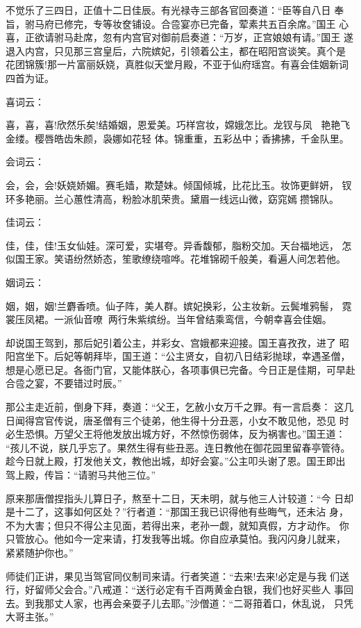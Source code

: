 不觉乐了三四日，正值十二日佳辰。有光禄寺三部各官回奏道：“臣等自八日
奉旨，驸马府已修完，专等妆奁铺设。合卺宴亦已完备，荤素共五百余席。”国王
心喜，正欲请驸马赴席，忽有内宫官对御前启奏道：“万岁，正宫娘娘有请。”国王
遂退入内宫，只见那三宫皇后，六院嫔妃，引领着公主，都在昭阳宫谈笑。真个是
花团锦簇!那一片富丽妖娆，真胜似天堂月殿，不亚于仙府瑶宫。有喜会佳姻新词
四首为证。

喜词云：

喜，喜，喜!欣然乐矣!结婚姻，恩爱美。巧样宫妆，嫦娥怎比。龙钗与凤，
艳艳飞金缕。樱唇皓齿朱颜，袅娜如花轻
体。锦重重，五彩丛中；香拂拂，千金队里。

会词云：

会，会，会!妖娆娇媚。赛毛嫱，欺楚妹。倾国倾城，比花比玉。妆饰更鲜妍，
钗环多艳丽。兰心蕙性清高，粉脸冰肌荣贵。黛眉一线远山微，窈窕嫣攒锦队。

佳词云：

佳，佳，佳!玉女仙娃。深可爱，实堪夸。异香馥郁，脂粉交加。天台福地远，
怎似国王家。笑语纷然娇态，笙歌缭绕喧哗。花堆锦砌千般美，看遍人间怎若他。

姻词云：

姻，姻，姻!兰麝香喷。仙子阵，美人群。嫔妃换彩，公主妆新。云鬓堆鸦髻，
霓裳压凤裙。一派仙音嘹，两行朱紫缤纷。当年曾结乘鸾信，今朝幸喜会佳姻。

却说国王驾到，那后妃引着公主，并彩女、宫娥都来迎接。国王喜孜孜，进了
昭阳宫坐下。后妃等朝拜毕，国王道：“公主贤女，自初八日结彩抛球，幸遇圣僧，
想是心愿已足。各衙门官，又能体朕心，各项事俱已完备。今日正是佳期，可早赴
合卺之宴，不要错过时辰。”

那公主走近前，倒身下拜，奏道：“父王，乞赦小女万千之罪。有一言启奏：
这几日闻得宫官传说，唐圣僧有三个徒弟，他生得十分丑恶，小女不敢见他，恐见
时必生恐惧。万望父王将他发放出城方好，不然惊伤弱体，反为祸害也。”国王道：
“孩儿不说，朕几乎忘了。果然生得有些丑恶。连日教他在御花园里留春亭管待。
趁今日就上殿，打发他关文，教他出城，却好会宴。”公主叩头谢了恩。国王即出
驾上殿，传旨：“请驸马共他三位。”

原来那唐僧捏指头儿算日子，熬至十二日，天未明，就与他三人计较道：“今
日却是十二了，这事如何区处？”行者道：“那国王我已识得他有些晦气，还未沾
身，不为大害；但只不得公主见面，若得出来，老孙一觑，就知真假，方才动作。
你只管放心。他如今一定来请，打发我等出城。你自应承莫怕。我闪闪身儿就来，
紧紧随护你也。”

师徒们正讲，果见当驾官同仪制司来请。行者笑道：“去来!去来!必定是与我
们送行，好留师父会合。”八戒道：“送行必定有千百两黄金白银，我们也好买些人
事回去。到我那丈人家，也再会亲耍子儿去耶。”沙僧道：“二哥箝着口，休乱说，
只凭大哥主张。”

